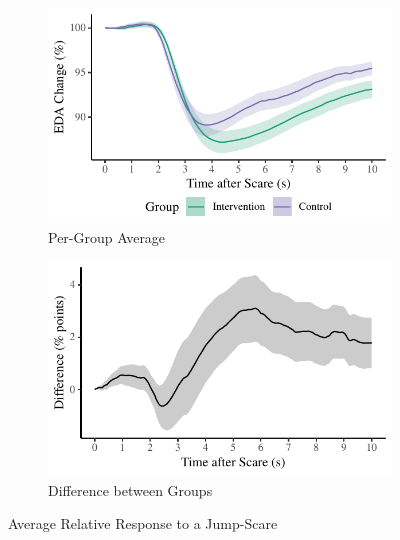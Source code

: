 \documentclass[12pt,a4paper]{article}\usepackage[]{graphicx}\usepackage[]{color}
\makeatletter
\def\maxwidth{ %
  \ifdim\Gin@nat@width>\linewidth
    \linewidth
  \else
    \Gin@nat@width
  \fi
}
\makeatother
\begin{document}
\begin{figure}[htb]
	\centering
	\begin{subfigure}[t]{.49\linewidth}


{\centering \includegraphics[width=\maxwidth]{figure/ResponseAfterScareRel-1} 

}



		\caption{Per-Group Average}
	\end{subfigure}
	\begin{subfigure}[t]{.49\linewidth}


{\centering \includegraphics[width=\maxwidth]{figure/CompareGroupsRel-1} 

}



		\caption{Difference between Groups}
	\end{subfigure}
	\caption{Average Relative Response to a Jump-Scare}
	\label{fig:ResponseAfterScareRel}
\end{figure}
\end{document}
